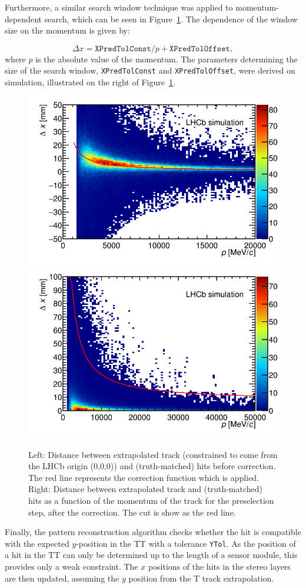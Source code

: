 Furthermore, a similar search window technique was applied to momentum-dependent search, which can be seen in Figure~\ref{fig:preselWindow}. The
dependence of the window size on the momentum is given by:

\begin{equation}
\Delta x = \texttt{XPredTolConst} / p + \texttt{XPredTolOffset},
\end{equation}
where $p$ is the absolute value of the momentum. The parameters determining the
size of the search window, \texttt{XPredTolConst} and
\texttt{XPredTolOffset}, were derived on simulation, illustrated on the right of
Figure~\ref{fig:preselWindow}.

\begin{figure}[!htbp]
 \begin{center}
  \includegraphics[width=0.49\linewidth]{figures/xPosCorrection1.png}
   \includegraphics[width=0.49\linewidth]{figures/preselWindow1.png}
   \caption{Left: Distance between extrapolated track (constrained to come from the LHCb origin (0,0,0)) and (truth-matched) hits
   before correction. The red line represents the correction function which is
   applied. Right: Distance between extrapolated track and (truth-matched) hits
   as a function of the momentum of the track for the preselection step, after
   the correction. The cut is show as the red line.
     \label{fig:preselWindow}}
 \end{center}
\end{figure}


Finally, the pattern reconstruction algorithm checks whether the hit is compatible with the expected $y$-position in the TT with a tolerance \texttt{YTol}. As the position of a hit in the TT can only be determined up to
the length of a sensor module, this provides only a weak constraint. The $x$
positions of the hits in the stereo layers are then updated, assuming the $y$ position from the T track extrapolation.

